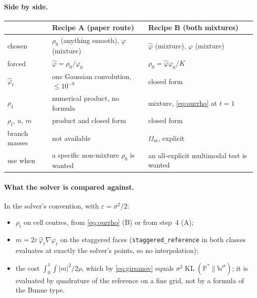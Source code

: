 \documentclass[11pt]{article}
\newcommand{\eps}{\varepsilon}
\newcommand{\code}[1]{\texttt{#1}}
\newcommand{\KL}{\operatorname{KL}}
\newcommand{\hphi}{\hat\varphi}
\theoremstyle{definition}
\theoremstyle{plain}
\begin{document}
\paragraph{Side by side.}
\begin{center}\small
\begin{tabular}{@{}lll@{}}
\toprule
 & Recipe A (paper route) & Recipe B (both mixtures) \\
\midrule
chosen & $\rho_0$ (anything smooth), $\varphi$ (mixture) & $\hphi$ (mixture), $\varphi$ (mixture) \\
forced & $\hphi=\rho_0/\varphi_0$ & $\rho_0=\hphi\varphi_0/K$ \\
$\hphi_t$ & one Gaussian convolution, $\le10^{-9}$ & closed form \\
$\rho_1$ & numerical product, no formula & mixture, \eqref{eq:ourrho} at $t=1$ \\
$\rho_t$, $u$, $m$ & product and closed form & closed form \\
branch masses & not available & $\Omega_{ik}$, explicit \\
use when & a specific non-mixture $\rho_0$ is wanted & an all-explicit multimodal test is wanted \\
\bottomrule
\end{tabular}
\end{center}

\paragraph{What the solver is compared against.}
In the solver's convention, with $\eps=\sigma^2/2$:
\begin{itemize}
  \item $\rho_t$ on cell centres, from \eqref{eq:ourrho} (B) or from step~4 (A);
  \item $m=2\eps\,\hphi_t\nabla\varphi_t$ on the staggered faces (\code{staggered\_reference}
        in both classes evaluates at exactly the solver's points, so no interpolation);
  \item the cost $\int_0^1\!\!\int|m|^2/2\rho$, which by \eqref{eq:girsanov} equals
        $\sigma^2\KL(\mathbb{P}^*\|\mathbb{W}^\sigma)$; it is evaluated by quadrature of the
        reference on a fine grid, not by a formula of the Bunne type.
\end{itemize}
\end{document}
